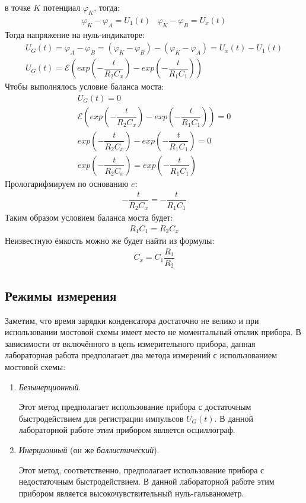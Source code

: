 \documentclass[a4paper, usenames, dvipsnames]{article}
\begin{document}
в точке $K$ потенциал $\varphi_K$, тогда:
\begin{eqnarray*}
    \varphi_K - \varphi_A = U_1(t) & \varphi_K - \varphi_B = U_x(t)
\end{eqnarray*}
Тогда напряжение на нуль-индикаторе:
\begin{gather*}
    U_G(t) = \varphi_A - \varphi_B = (\varphi_K - \varphi_B) - (\varphi_K - \varphi_A) = U_x(t) - U_1(t) \\
    U_G(t) = \mathcal{E}\left(exp\left(-\dfrac{t}{R_2C_x}\right) - exp\left(-\dfrac{t}{R_1C_1}\right)\right)
\end{gather*}
Чтобы выполнялось условие баланса моста:
\begin{gather*}
    U_G(t) = 0 \\
    \mathcal{E}\left(exp\left(-\dfrac{t}{R_2C_x}\right) - exp\left(-\dfrac{t}{R_1C_1}\right)\right) = 0 \\
    exp\left(-\dfrac{t}{R_2C_x}\right) - exp\left(-\dfrac{t}{R_1C_1}\right) = 0 \\
    exp\left(-\dfrac{t}{R_2C_x}\right) = exp\left(-\dfrac{t}{R_1C_1}\right)
\end{gather*}
Прологарифмируем по основанию $e$:
\begin{gather*}
    -\dfrac{t}{R_2C_x} = -\dfrac{t}{R_1C_1}
\end{gather*}
Таким образом условием баланса моста будет:
\begin{gather}
    R_1C_1 = R_2C_x \label{Условие баланса}
\end{gather}
Неизвестную ёмкость можно же будет найти из формулы:
\begin{gather}
    C_x = C_1\dfrac{R_1}{R_2} \label{Ёмкость конденсатора}
\end{gather}

\subsection*{Режимы измерения}

Заметим, что время зарядки конденсатора достаточно не велико
и при использовании мостовой схемы имеет место не моментальный отклик прибора.
В зависимости от включённого в цепь измерительного прибора,
данная лабораторная работа предполагает два метода измерений
с использованием мостовой схемы:
\begin{enumerate}
    \item {\it Безынерционный}.

          Этот метод предполагает использование прибора с достаточным
          быстродействием для регистрации импульсов $U_G(t)$.
          В данной лабораторной работе этим прибором является осциллограф.
    \item {\it Инерционный} (он же {\it баллистический}).

          Этот метод, соответственно, предполагает использование прибора с недостаточным
          быстродействием. В данной лабораторной работе этим прибором является
          высокочувствительный нуль-гальванометр.
\end{enumerate}
\end{document}
